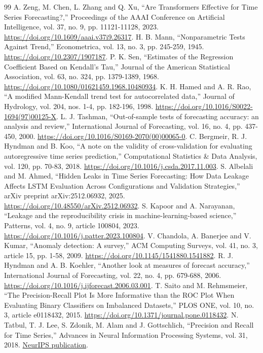 \documentclass[10pt,a4paper,twocolumn]{article}
\begin{document}
\begin{thebibliography}{99}
 A. Zeng, M. Chen, L. Zhang and Q. Xu, ``Are Transformers Effective for Time Series Forecasting?,'' Proceedings of the AAAI Conference on Artificial Intelligence, vol. 37, no. 9, pp. 11121-11128, 2023. \url{https://doi.org/10.1609/aaai.v37i9.26317}.
 H. B. Mann, ``Nonparametric Tests Against Trend,'' Econometrica, vol. 13, no. 3, pp. 245-259, 1945. \url{https://doi.org/10.2307/1907187}.
 P. K. Sen, ``Estimates of the Regression Coefficient Based on Kendall's Tau,'' Journal of the American Statistical Association, vol. 63, no. 324, pp. 1379-1389, 1968. \url{https://doi.org/10.1080/01621459.1968.10480934}.
 K. H. Hamed and A. R. Rao, ``A modified Mann-Kendall trend test for autocorrelated data,'' Journal of Hydrology, vol. 204, nos. 1-4, pp. 182-196, 1998. \url{https://doi.org/10.1016/S0022-1694(97)00125-X}.
 L. J. Tashman, ``Out-of-sample tests of forecasting accuracy: an analysis and review,'' International Journal of Forecasting, vol. 16, no. 4, pp. 437-450, 2000. \url{https://doi.org/10.1016/S0169-2070(00)00065-0}.
 C. Bergmeir, R. J. Hyndman and B. Koo, ``A note on the validity of cross-validation for evaluating autoregressive time series prediction,'' Computational Statistics \& Data Analysis, vol. 120, pp. 70-83, 2018. \url{https://doi.org/10.1016/j.csda.2017.11.003}.
 S. Albelali and M. Ahmed, ``Hidden Leaks in Time Series Forecasting: How Data Leakage Affects LSTM Evaluation Across Configurations and Validation Strategies,'' arXiv preprint arXiv:2512.06932, 2025. \url{https://doi.org/10.48550/arXiv.2512.06932}.
 S. Kapoor and A. Narayanan, ``Leakage and the reproducibility crisis in machine-learning-based science,'' Patterns, vol. 4, no. 9, article 100804, 2023. \url{https://doi.org/10.1016/j.patter.2023.100804}.
 V. Chandola, A. Banerjee and V. Kumar, ``Anomaly detection: A survey,'' ACM Computing Surveys, vol. 41, no. 3, article 15, pp. 1-58, 2009. \url{https://doi.org/10.1145/1541880.1541882}.
 R. J. Hyndman and A. B. Koehler, ``Another look at measures of forecast accuracy,'' International Journal of Forecasting, vol. 22, no. 4, pp. 679-688, 2006. \url{https://doi.org/10.1016/j.ijforecast.2006.03.001}.
 T. Saito and M. Rehmsmeier, ``The Precision-Recall Plot Is More Informative than the ROC Plot When Evaluating Binary Classifiers on Imbalanced Datasets,'' PLOS ONE, vol. 10, no. 3, article e0118432, 2015. \url{https://doi.org/10.1371/journal.pone.0118432}.
 N. Tatbul, T. J. Lee, S. Zdonik, M. Alam and J. Gottschlich, ``Precision and Recall for Time Series,'' Advances in Neural Information Processing Systems, vol. 31, 2018. \href{https://proceedings.neurips.cc/paper/2018/hash/8f468c873a32bb0619eaeb2050ba45d1-Abstract.html}{NeurIPS publication}.

\end{thebibliography}
\end{document}
